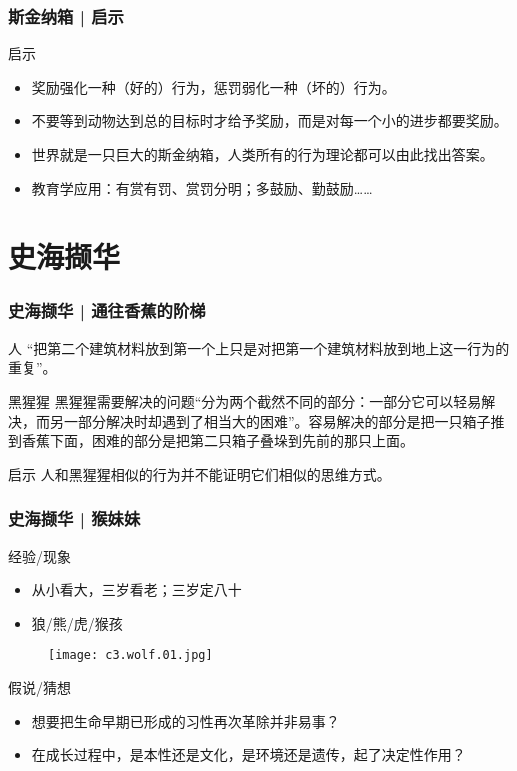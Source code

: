 \begin{frame}
  \frametitle{斯金纳箱 | 启示}
  \begin{block}{启示}
    \begin{itemize}
      \item 奖励强化一种（好的）行为，惩罚弱化一种（坏的）行为。
      \item 不要等到动物达到总的目标时才给予奖励，而是对每一个小的进步都要奖励。
      \item 世界就是一只巨大的斯金纳箱，人类所有的行为理论都可以由此找出答案。
      \item 教育学应用：有赏有罚、赏罚分明；多鼓励、勤鼓励……
    \end{itemize}
  \end{block}
\end{frame}

\section{史海撷华}
\begin{frame}
  \frametitle{史海撷华 | 通往香蕉的阶梯}
  \begin{block}{人}
    “把第二个建筑材料放到第一个上只是对把第一个建筑材料放到地上这一行为的重复”。
  \end{block}
  \pause
  \begin{block}{黑猩猩}
    黑猩猩需要解决的问题“分为两个截然不同的部分：一部分它可以轻易解决，而另一部分解决时却遇到了相当大的困难”。容易解决的部分是把一只箱子推到香蕉下面，困难的部分是把第二只箱子叠垛到先前的那只上面。
  \end{block}
  \pause
  \begin{block}{启示}
    人和黑猩猩相似的行为并不能证明它们相似的思维方式。
  \end{block}
\end{frame}

\begin{frame}
  \frametitle{史海撷华 | 猴妹妹}
  \begin{block}{经验/现象}
    \begin{itemize}
      \item 从小看大，三岁看老；三岁定八十
      \item 狼/熊/虎/猴孩
    \end{itemize}
    \vspace{-1.5em}
    \begin{figure}
      \centering
      \texttt{[image: c3.wolf.01.jpg]}
    \end{figure}
  \end{block}
  \pause
  \begin{block}{假说/猜想}
    \begin{itemize}
      \item 想要把生命早期已形成的习性再次革除并非易事？
      \item 在成长过程中，是本性还是文化，是环境还是遗传，起了决定性作用？
    \end{itemize}
  \end{block}
\end{frame}

